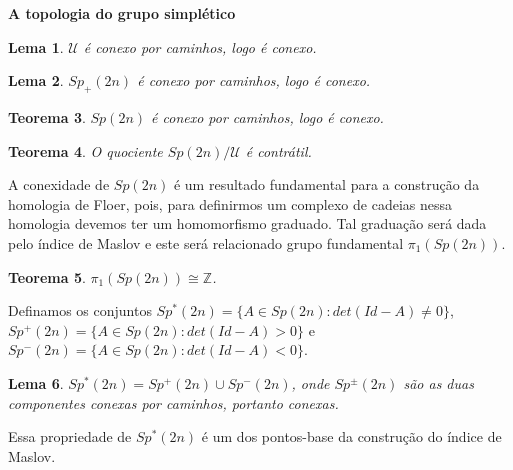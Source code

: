 \documentclass{beamer}
\newcommand{\titulo}[1]{\centering \textbf{#1}}
\newtheorem{teorema}{Teorema}[section]
\newtheorem{lema}[teorema]{Lema}
\newcommand{\grupofundamental}[1]{\pi_{1}(#1)}
\newcommand{\gruposimpletico}[1]{Sp(#1)}
\newcommand{\gruposimpleticonaodegenerado}[1]{Sp^{#1}(2n)}
\newcommand{\gruposimpleticopositivo}[1]{Sp_{+}(#1)}
\newcommand{\inteiros}{\mathbb{Z}}
\newcommand{\matrizSimpleticaOrtogonal}{\mathcal{U}}
\begin{document}
\begin{frame}
	\titulo{A topologia do grupo simplético}
	\begin{lema}
		$\matrizSimpleticaOrtogonal$ é conexo por caminhos, logo é conexo.
	\end{lema}
	
	\begin{lema}
		$\gruposimpleticopositivo{2n}$ é conexo por caminhos, logo é conexo.
	\end{lema}
	
	\begin{teorema}
		$\gruposimpletico{2n}$ é conexo por caminhos, logo é conexo.
	\end{teorema}
	
	\begin{teorema}
		O quociente $\gruposimpletico{2n}/\matrizSimpleticaOrtogonal$ é contrátil.
	\end{teorema}
	
\end{frame}

\begin{frame}
	A conexidade de $\gruposimpletico{2n}$ é um resultado fundamental para a construção da homologia de Floer, pois, para definirmos um complexo de cadeias nessa homologia devemos ter um homomorfismo graduado. Tal graduação será dada pelo índice de Maslov e este será relacionado grupo fundamental $\grupofundamental{\gruposimpletico{2n}}$.
	
	\begin{teorema}
		$\grupofundamental{\gruposimpletico{2n}} \cong \inteiros$.
	\end{teorema}
\end{frame}

\begin{frame}
	Definamos os conjuntos $\gruposimpleticonaodegenerado{*} = \{ A \in \gruposimpletico{2n}: det(Id-A)\neq 0 \}$, $\gruposimpleticonaodegenerado{+} = \{ A \in \gruposimpletico{2n}: det(Id-A)> 0 \}$ e  $\gruposimpleticonaodegenerado{-} = \{ A \in \gruposimpletico{2n}: det(Id-A)< 0 \}$.

	\begin{lema}
		$\gruposimpleticonaodegenerado{*} = \gruposimpleticonaodegenerado{+}\cup \gruposimpleticonaodegenerado{-}$, onde $\gruposimpleticonaodegenerado{\pm}$ são as duas componentes conexas por caminhos, portanto conexas.
	\end{lema}
	
	Essa propriedade de $\gruposimpleticonaodegenerado{*}$ é um dos pontos-base da construção do índice de Maslov.
\end{frame}
\end{document}
